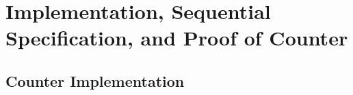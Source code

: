 



\section{Implementation, Sequential Specification, and Proof of Counter}
\label{sec:implementation, sequential specification, and proof of counter}



\subsection{Counter Implementation}
\label{subsec:counter implementation}


